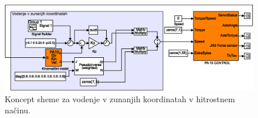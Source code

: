 \begin{figure}[!h]
	\centering
	\includegraphics[trim={0 0cm 0 0cm},scale=0.5]{./Slike/zunanje_koordinate_vel.eps}
	\caption{Koncept \simulink sheme za vodenje v zunanjih koordinatah v hitrostnem na\v{c}inu.}
	\label{fig:zunanje_koordinate_vel}
\end{figure}
